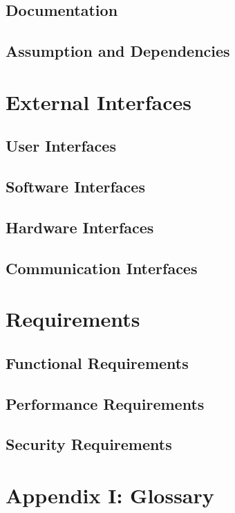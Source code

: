 \documentclass[english,titlepage,a4paper]{report}
\begin{document}
\section{Documentation}

\section{Assumption and Dependencies}


\chapter{External Interfaces}
\section{User Interfaces}

\section{Software Interfaces}

\section{Hardware Interfaces}

\section{Communication Interfaces}


\chapter{Requirements}
\section{Functional Requirements}

\section{Performance Requirements}

\section{Security Requirements}


\chapter*{Appendix I: Glossary}
\end{document}
